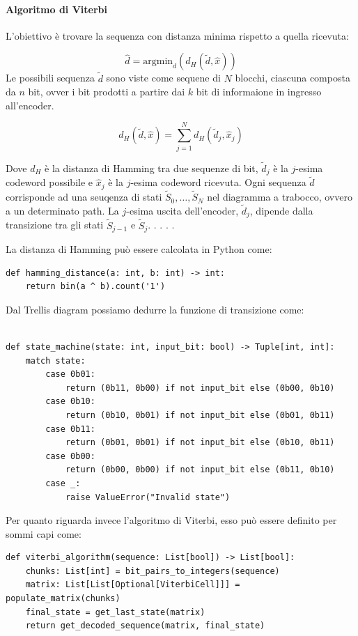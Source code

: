 \paragraph*{Algoritmo di Viterbi}
L'obiettivo è trovare la sequenza con distanza minima rispetto a quella ricevuta:

\[
    \hat{d} = \text{argmin}_d \left( d_H \left(\tilde{d}, \hat{x}\right) \right)
\]
Le possibili sequenza $\tilde{d}$ sono viste come sequene di $N$ blocchi, ciascuna composta da 
$n$ bit, ovver i bit prodotti a partire dai $k$ bit di informaione in ingresso all'encoder.


\[
    d_H\left(\tilde{d}, \hat{x}\right) = \sum_{j=1}^{N} d_H\left(\tilde{d}_j, \hat{x}_j\right)
\]

Dove $d_H$ è la distanza di Hamming tra due sequenze di bit, $\tilde{d}_j$ è la $j$-esima codeword possibile e $\hat{x}_j$ è la $j$-esima codeword ricevuta.
Ogni sequenza $\tilde{d}$ corrisponde ad una seuqenza di stati $\tilde{S}_0, \ldots, \tilde{S}_N$ nel diagramma a trabocco, ovvero a un determinato path. La $j$-esima uscita dell'encoder, $\tilde{d}_j$, dipende dalla transizione tra gli stati $\tilde{S}_{j-1}$ e $\tilde{S}_j$.
.
.
.
.

La distanza di Hamming può essere calcolata in Python come:
\begin{verbatim}
def hamming_distance(a: int, b: int) -> int:
    return bin(a ^ b).count('1')
\end{verbatim}


Dal Trellis diagram possiamo dedurre la funzione di transizione come:
\begin{verbatim}

def state_machine(state: int, input_bit: bool) -> Tuple[int, int]:
    match state:
        case 0b01:
            return (0b11, 0b00) if not input_bit else (0b00, 0b10)
        case 0b10:
            return (0b10, 0b01) if not input_bit else (0b01, 0b11)
        case 0b11:
            return (0b01, 0b01) if not input_bit else (0b10, 0b11)
        case 0b00:
            return (0b00, 0b00) if not input_bit else (0b11, 0b10)
        case _:
            raise ValueError("Invalid state")

\end{verbatim}
Per quanto riguarda invece l'algoritmo di Viterbi, esso può essere definito per sommi capi come:

\begin{verbatim}
def viterbi_algorithm(sequence: List[bool]) -> List[bool]:
    chunks: List[int] = bit_pairs_to_integers(sequence)
    matrix: List[List[Optional[ViterbiCell]]] = populate_matrix(chunks)
    final_state = get_last_state(matrix)
    return get_decoded_sequence(matrix, final_state)
\end{verbatim}

